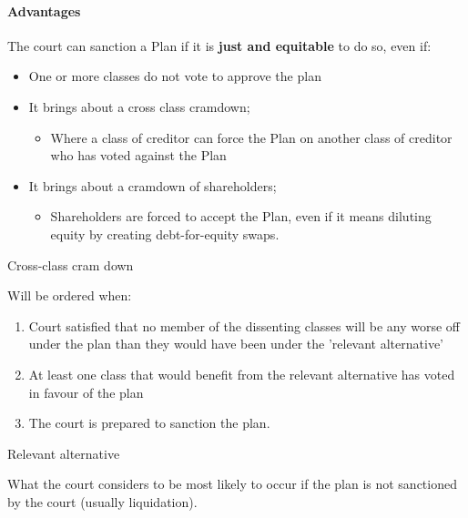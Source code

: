 \documentclass[
]{article}
\providecommand{\tightlist}{%
  \setlength{\itemsep}{0pt}\setlength{\parskip}{0pt}}
\newenvironment{env-751485c0-9cbb-4b3b-8497-6bad2ef120e5}
{
    \savenotes\tcolorbox[blanker,breakable,left=5pt,borderline west={2pt}{-4pt}{gold}]
}
{
    \endtcolorbox\spewnotes
}
\newenvironment{env-0630ef60-d677-4921-bba8-06d563fa419c}
{
    \savenotes\tcolorbox[blanker,breakable,left=5pt,borderline west={2pt}{-4pt}{pink}]
}
{
    \endtcolorbox\spewnotes
}
\begin{document}
\hypertarget{advantages}{%
\paragraph{Advantages}\label{advantages}}

The court can sanction a Plan if it is \textbf{just and equitable} to do
so, even if:

\begin{itemize}
\tightlist
\item
  One or more classes do not vote to approve the plan
\item
  It brings about a cross class cramdown;

  \begin{itemize}
  \tightlist
  \item
    Where a class of creditor can force the Plan on another class of
    creditor who has voted against the Plan
  \end{itemize}
\item
  It brings about a cramdown of shareholders;

  \begin{itemize}
  \tightlist
  \item
    Shareholders are forced to accept the Plan, even if it means
    diluting equity by creating debt-for-equity swaps.
  \end{itemize}
\end{itemize}

\begin{env-0630ef60-d677-4921-bba8-06d563fa419c}

Cross-class cram down

Will be ordered when:

\begin{enumerate}
\tightlist
\item
  Court satisfied that no member of the dissenting classes will be any
  worse off under the plan than they would have been under the 'relevant
  alternative'
\item
  At least one class that would benefit from the relevant alternative
  has voted in favour of the plan
\item
  The court is prepared to sanction the plan.
\end{enumerate}

\end{env-0630ef60-d677-4921-bba8-06d563fa419c}

\begin{env-751485c0-9cbb-4b3b-8497-6bad2ef120e5}

Relevant alternative

What the court considers to be most likely to occur if the plan is not
sanctioned by the court (usually liquidation).

\end{env-751485c0-9cbb-4b3b-8497-6bad2ef120e5}
\end{document}
